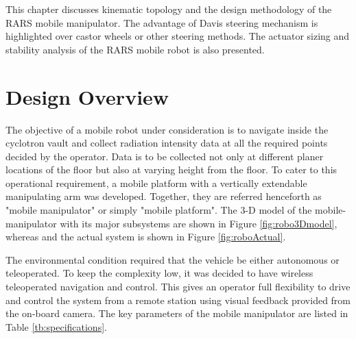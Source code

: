 This chapter   discusses kinematic topology and  the  design methodology of the RARS mobile manipulator. The advantage of  Davis steering mechanism is highlighted over castor wheels  or other steering methods. The actuator sizing and stability analysis of the RARS mobile robot is also presented.    
\section{Design Overview}
 The objective of a  mobile robot under consideration is to navigate inside the cyclotron vault and collect radiation intensity data at all the required points decided by the operator. Data is to be collected not only at different planer locations of the floor but also at varying height from the floor. To cater to this operational requirement, a mobile platform with a vertically extendable manipulating arm was developed. Together, they are   referred henceforth as "mobile manipulator" or simply "mobile platform". The 3-D model of the mobile-manipulator with its major subsystems are shown in Figure \ref{fig:robo3Dmodel}, whereas  and the actual   system  is shown in Figure  \ref{fig:roboActual}. 

 The environmental condition required that the vehicle be either  autonomous or teleoperated. To keep the complexity low, it was decided to have wireless teleoperated   navigation and control. This gives an  operator full flexibility to drive  and control the system from a remote station  using  visual  feedback provided from the on-board camera. The key parameters of the mobile manipulator are listed in  Table \ref{tb:specifications}.

